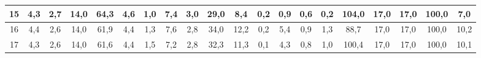 \begin{sidewaystable}[]
\begin{tabular}{|c|c|c|c|c|c|c|c|c|c|c|c|c|c|c|c|c|c|c|c|}
    15 & 4,3                                              & 2,7                                              & 14,0                                             & 64,3                                             & 4,6                                              & 1,0                                              & 7,4                                              & 3,0                                              & 29,0                                             & 8,4                                              & 0,2                                              & 0,9                                              & 0,6                                              & 0,2                                              & 104,0                                           & 17,0                                            & 17,0                                            & 100,0                                           & 7,0                                             \\ \hline
    16 & 4,4                                              & 2,6                                              & 14,0                                             & 61,9                                             & 4,4                                              & 1,3                                              & 7,6                                              & 2,8                                              & 34,0                                             & 12,2                                             & 0,2                                              & 5,4                                              & 0,9                                              & 1,3                                              & 88,7                                            & 17,0                                            & 17,0                                            & 100,0                                           & 10,2                                            \\ \hline
    17 & 4,3                                              & 2,6                                              & 14,0                                             & 61,6                                             & 4,4                                              & 1,5                                              & 7,2                                              & 2,8                                              & 32,3                                             & 11,3                                             & 0,1                                              & 4,3                                              & 0,8                                              & 1,0                                              & 100,4                                           & 17,0                                            & 17,0                                            & 100,0                                           & 10,1                                            \\ \hline

\end{tabular}
\end{sidewaystable}
